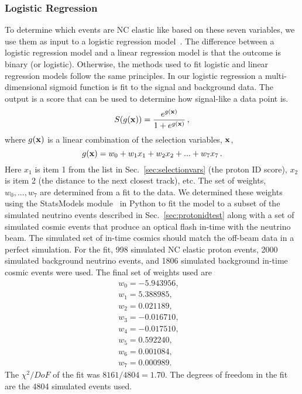   \subsubsection{Logistic Regression}
    To determine which events are NC elastic like based on these seven
    variables, we use them as input to a logistic regression
    model~\cite{Hosmer2005}. The difference between a logistic regression model
    and a linear regression model is that the outcome is binary (or logistic).
    Otherwise, the methods used to fit logistic and linear regression models
    follow the same principles. In our logistic regression a multi-dimensional
    sigmoid function is fit to the signal and background data. The output is a
    score that can be used to determine how signal-like a data point is.
    \begin{equation*}
      S(g({\bf x})) = \frac{e^{g({\bf x})}}{1 + e^{g({\bf x})}} \,,
    \end{equation*}
    where $g({\bf x})$ is a linear combination of the selection variables, ${\bf x}$,
    \begin{equation*}
      g({\bf x}) = w_0 + w_1 x_1 + w_2 x_2 + ... + w_7 x_7 \,.
    \end{equation*}
    Here $x_1$ is item 1 from the list in Sec.~\ref{sec:selectionvars} (the
    proton ID score), $x_2$ is item 2 (the distance to the next closest track),
    etc. The set of weights, $w_0,...,w_7$ are determined from a fit to the
    data. We determined these weights using the StatsModels
    module~\cite{pystats} in Python to fit the model to a subset of the
    simulated neutrino events described in Sec.~\ref{sec:protonidtest} along
    with a set of simulated cosmic events that produce an optical flash in-time
    with the neutrino beam. The simulated set of in-time cosmics should match
    the off-beam data in a perfect simulation. For the fit, 998 simulated NC
    elastic proton events, 2000 simulated background neutrino events, and 1806
    simulated background in-time cosmic events were used. The final set of
    weights used are
    \begin{equation}
      \begin{aligned}
        w_0 = -5.943956,& \\
        w_1 =  5.388985,& \\
        w_2 =  0.021189,& \\
        w_3 = -0.016710,& \\
        w_4 = -0.017510,& \\
        w_5 =  0.592240,& \\
        w_6 =  0.001084,& \\
        w_7 =  0.000989.&
      \end{aligned}
    \end{equation}
    The $\chi^2/DoF$ of the fit was $8161/4804 = 1.70$. The degrees of freedom
    in the fit are the 4804 simulated events used.
    
